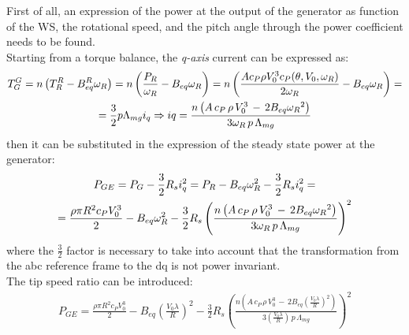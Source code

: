 First of all, an expression of the power at the output of the generator as function of the WS, the rotational speed, and the pitch angle through the power coefficient needs to be found. \\
Starting from a torque balance, the \textit{q-axis} current can be expressed as:
\begin{gather}
  T_G^G = n\left(T_R^R - B_{eq}^R\omega_R\right) = n\left(\frac{P_R}{\omega_R} - B_{eq}\omega_R\right) = n\left(\frac{A c_P \rho V_0^3 c_P(\theta, V_0, \omega_R)}{2\omega_R} - B_{eq}\omega_R\right) = \notag \\
   = \frac{3}{2}p\Lambda_{mg}i_q \Rightarrow iq = \frac{n\left(A \, c_P \, \rho \, V_0^3 \,-\,2B_{eq}{\omega_R}^2\right)}{3\omega_R\,p\,\Lambda_{mg}} 
\end{gather}
then it can be substituted in the expression of the steady state power at the generator:
\begin{gather}
  P_{GE} = P_{G} - \frac{3}{2} R_s i_q^2 = P_R - B_{eq}\omega_R^2 - \frac{3}{2} R_s i_q^2 = \\ \notag
  =\frac{\rho\pi R^2c_PV_0^3}{2} - B_{eq}\omega_R^2-\frac{3}{2}R_s\left(\frac{n\left(A \, c_P \, \rho \, V_0^3 \,-\,2B_{eq}{\omega_R}^2\right)}{3\omega_R\,p\,\Lambda_{mg}}\right)^2 \notag \label{eq:P_G_out_eq}
\end{gather}
where the $\frac{3}{2}$ factor is necessary to take into account that the transformation from the abc reference frame to the dq is not power invariant.\\
The tip speed ratio can be introduced:
\begin{gather}
  P_{GE} = \frac{\rho\pi R^2c_PV_0^3}{2} - B_{eq}\left(\frac{V_0\lambda}{R}\right)^2-\frac{3}{2}R_s\left(\frac{n\left(A \, c_P \, \rho \, V_0^3 \,-\,2B_{eq}{\left(\frac{V_0\lambda}{R}\right)}^2\right)}{3\left(\frac{V_0\lambda}{R}\right)\,p\,\Lambda_{mg}}\right)^2 \label{eq:P_G_out_lambda}
\end{gather} 

